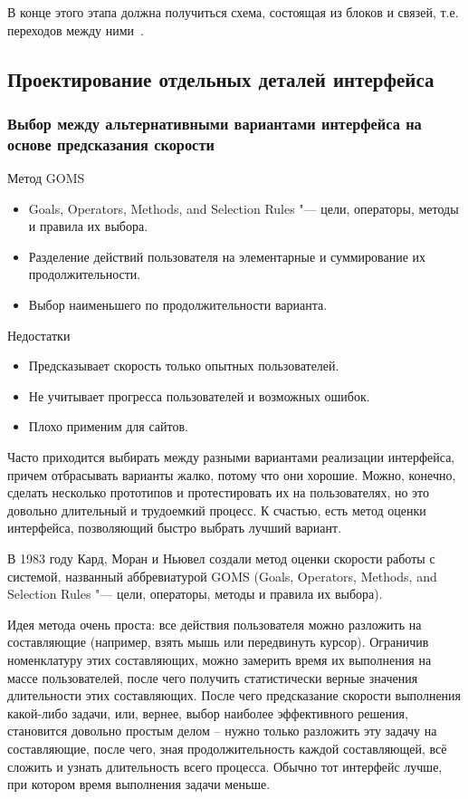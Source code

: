 \documentclass{../industrial-development}
\begin{document}
В конце этого этапа должна получиться схема, состоящая из блоков и связей, т.е. переходов между ними~\cite[с.~118--119]{Golovach}.

\subsection{Проектирование отдельных деталей интерфейса}

\begin{frame} \frametitle{Выбор между альтернативными вариантами интерфейса на основе предсказания скорости}
 \begin{block}{Метод GOMS}
  \begin{itemize}
   \item Goals, Operators, Methods, and Selection Rules "--- цели, операторы, методы и правила их выбора.
   \item Разделение действий пользователя на элементарные и суммирование их продолжительности.
   \item Выбор наименьшего по продолжительности варианта.
  \end{itemize}
 \end{block}
 \begin{block}{Недостатки}
  \begin{itemize}
   \item Предсказывает скорость только опытных пользователей.
   \item Не учитывает прогресса пользователей и возможных ошибок.
   \item Плохо применим для сайтов.
  \end{itemize}
 \end{block}
\end{frame}

\lecturenotes

Часто приходится выбирать между разными вариантами реализации интерфейса, причем отбрасывать варианты жалко, потому что они хорошие. Можно, конечно, сделать несколько прототипов и протестировать их на пользователях, но это довольно длительный и трудоемкий процесс. К счастью, есть метод оценки интерфейса, позволяющий быстро выбрать лучший вариант.

В 1983 году Кард, Моран и Ньювел создали метод оценки скорости работы с системой, названный аббревиатурой GOMS (Goals, Operators, Methods, and Selection Rules "--- цели, операторы, методы и правила их выбора).

Идея метода очень проста: все действия пользователя можно разложить на составляющие (например, взять мышь или передвинуть курсор). Ограничив номенклатуру этих составляющих, можно замерить время их выполнения на массе пользователей, после чего получить статистически верные значения длительности этих составляющих. После чего предсказание скорости выполнения какой-либо задачи, или, вернее, выбор наиболее эффективного решения, становится довольно простым делом – нужно только разложить эту задачу на составляющие, после чего, зная продолжительность каждой составляющей, всё сложить и узнать длительность всего процесса. Обычно тот интерфейс лучше, при котором время выполнения задачи меньше.
\end{document}
